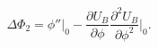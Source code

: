 \begin{equation}
\Delta\Phi_2=\phi''\vert_0-\frac{\partial U_B}{\partial
\phi}\frac{\partial^2 U_B}{\partial \phi^2}\vert_0.
\end{equation}

